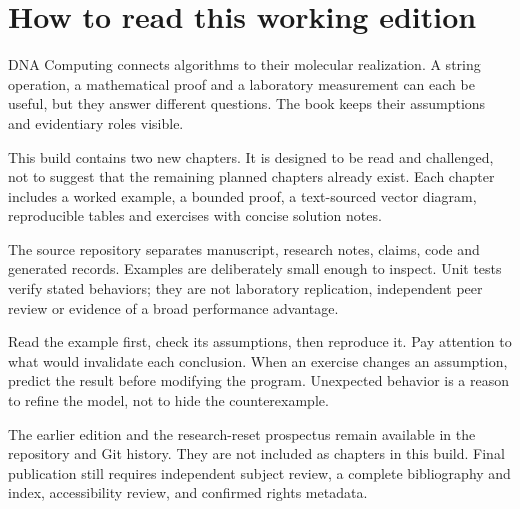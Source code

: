 \chapter*{How to read this working edition}

DNA Computing connects algorithms to their molecular realization. A string operation, a mathematical proof and a laboratory measurement can each be useful, but they answer different questions. The book keeps their assumptions and evidentiary roles visible.

This build contains two new chapters. It is designed to be read and challenged,
not to suggest that the remaining planned chapters already exist. Each chapter
includes a worked example, a bounded proof, a text-sourced vector diagram,
reproducible tables and exercises with concise solution notes.

The source repository separates manuscript, research notes, claims, code and
generated records. Examples are deliberately small enough to inspect. Unit
tests verify stated behaviors; they are not laboratory replication, independent
peer review or evidence of a broad performance advantage.

Read the example first, check its assumptions, then reproduce it. Pay attention
to what would invalidate each conclusion. When an exercise changes an
assumption, predict the result before modifying the program. Unexpected
behavior is a reason to refine the model, not to hide the counterexample.

The earlier edition and the research-reset prospectus remain available in the
repository and Git history. They are not included as chapters in this build.
Final publication still requires independent subject review, a complete
bibliography and index, accessibility review, and confirmed rights metadata.
